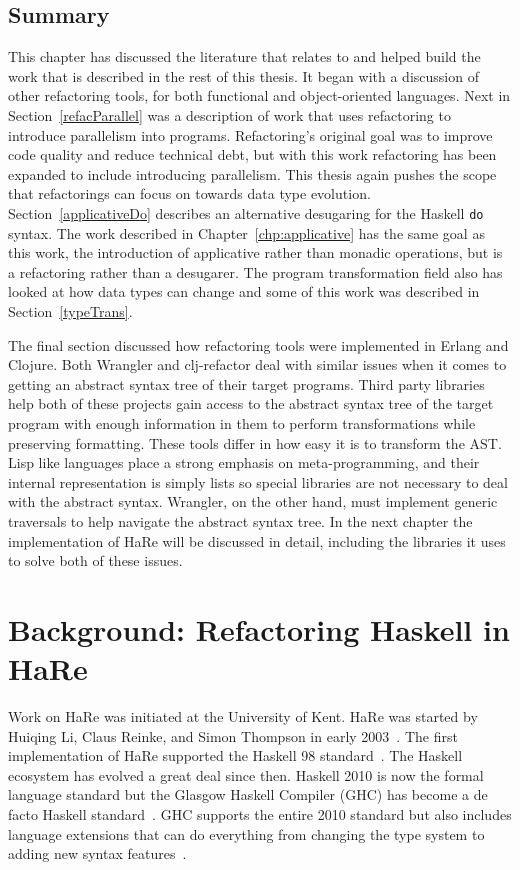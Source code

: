 \section{Summary}

This chapter has discussed the literature that relates to and helped build the work that is described in the rest of this thesis. It began with a discussion of other refactoring tools, for both functional and object-oriented languages. Next in Section~\ref{refacParallel} was a description of work that uses refactoring to introduce parallelism into programs. Refactoring's original goal was to improve code quality and reduce technical debt, but with this work refactoring has been expanded to include introducing parallelism. This thesis again pushes the scope that refactorings can focus on towards data type evolution. Section~\ref{applicativeDo} describes an alternative desugaring for the Haskell \texttt{do} syntax. The work described in Chapter~\ref{chp:applicative} has the same goal as this work, the introduction of applicative rather than monadic operations, but is a refactoring rather than a desugarer. The program transformation field also has looked at how data types can change and some of this work was described in Section~\ref{typeTrans}. 

The final section discussed how refactoring tools were implemented in Erlang and Clojure. Both Wrangler and clj-refactor deal with similar issues when it comes to getting an abstract syntax tree of their target programs. Third party libraries help both of these projects gain access to the abstract syntax tree of the target program with enough information in them to perform transformations while preserving formatting. These tools differ in how easy it is to transform the AST. Lisp like languages place a strong emphasis on meta-programming, and their internal representation is simply lists so special libraries are not necessary to deal with the abstract syntax. Wrangler, on the other hand, must implement generic traversals to help navigate the abstract syntax tree. In the next chapter the implementation of HaRe will be discussed in detail, including the libraries it uses to solve both of these issues. 

\chapter{Background: Refactoring Haskell in HaRe}
\label{chp:hare}


Work on HaRe was initiated at the University of Kent. HaRe was started by Huiqing Li, Claus Reinke, and Simon Thompson in early 2003~\citep{refacWebsite}. The first implementation of HaRe supported the Haskell 98 standard~\citep{huiqingThesis}. The Haskell ecosystem has evolved a great deal since then. Haskell 2010 is now the formal language standard but the Glasgow Haskell Compiler (GHC) has become a de facto Haskell standard~\citep{refacTools}. GHC supports the entire 2010 standard but also includes language extensions that can do everything from changing the type system to adding new syntax features~\citep{langExts}.

